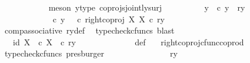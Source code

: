 \begin{isabellebody}
\ \ \ \ \ \ \ \ \ \ \isamarkupfalse%
\ {\isacharparenleft}{\kern0pt}meson\ y{\isacharunderscore}{\kern0pt}type\ coprojs{\isacharunderscore}{\kern0pt}jointly{\isacharunderscore}{\kern0pt}surj{\isacharparenright}{\kern0pt}\isanewline
\ \ \ \ \ \ \ \ \isamarkupfalse%
\ {\isasymrho}y{\isacharcolon}{\kern0pt}\ {\isachardoublequoteopen}{\isasymrho}\ {\isasymcirc}\isactrlsub c\ y\ {\isacharequal}{\kern0pt}\ {\isasymlangle}ry{\isacharcomma}{\kern0pt}\ {\isasymf}{\isasymrangle}{\isachardoublequoteclose}\isanewline
\ \ \ \ \ \ \ \ \isamarkupfalse%
\ {\isacharminus}{\kern0pt}\ \isanewline
\ \ \ \ \ \ \ \ \ \ \isamarkupfalse%
\ {\isachardoublequoteopen}{\isasymrho}\ {\isasymcirc}\isactrlsub c\ y\ {\isacharequal}{\kern0pt}\ {\isacharparenleft}{\kern0pt}{\isasymrho}\ {\isasymcirc}\isactrlsub c\ right{\isacharunderscore}{\kern0pt}coproj\ X\ X{\isacharparenright}{\kern0pt}\ {\isasymcirc}\isactrlsub c\ ry{\isachardoublequoteclose}\isanewline
\ \ \ \ \ \ \ \ \ \ \ \ \isamarkupfalse%
\ comp{\isacharunderscore}{\kern0pt}associative{}\ ry{\isacharunderscore}{\kern0pt}def\ \isamarkupfalse%
\ {\isacharparenleft}{\kern0pt}typecheck{\isacharunderscore}{\kern0pt}cfuncs{\isacharcomma}{\kern0pt}\ blast{\isacharparenright}{\kern0pt}\isanewline
\ \ \ \ \ \ \ \ \ \ \isamarkupfalse%
\ \isamarkupfalse%
\ {\isachardoublequoteopen}{\isachardot}{\kern0pt}{\isachardot}{\kern0pt}{\isachardot}{\kern0pt}\ {\isacharequal}{\kern0pt}\ {\isasymlangle}id\ X{\isacharcomma}{\kern0pt}\ {\isasymf}\ {\isasymcirc}\isactrlsub c\ {\isasymbeta}\isactrlbsub X\isactrlesub {\isasymrangle}\ \ {\isasymcirc}\isactrlsub c\ ry{\isachardoublequoteclose}\isanewline
\ \ \ \ \ \ \ \ \ \ \ \ \isamarkupfalse%
\ {\isasymrho}{\isacharunderscore}{\kern0pt}def\ \ \isamarkupfalse%
\ right{\isacharunderscore}{\kern0pt}coproj{\isacharunderscore}{\kern0pt}cfunc{\isacharunderscore}{\kern0pt}coprod\ \isamarkupfalse%
\ {\isacharparenleft}{\kern0pt}typecheck{\isacharunderscore}{\kern0pt}cfuncs{\isacharcomma}{\kern0pt}\ presburger{\isacharparenright}{\kern0pt}\isanewline
\ \ \ \ \ \ \ \ \ \ \isamarkupfalse%
\ \isamarkupfalse%
\ {\isachardoublequoteopen}{\isachardot}{\kern0pt}{\isachardot}{\kern0pt}{\isachardot}{\kern0pt}\ {\isacharequal}{\kern0pt}\ {\isasymlangle}ry{\isacharcomma}{\kern0pt}\ {\isasymf}{\isasymrangle}{\isachardoublequoteclose}\isanewline
\ \ \ \ \ \ \ \ \ \ \ \ \isamarkupfalse%

\end{isabellebody}
